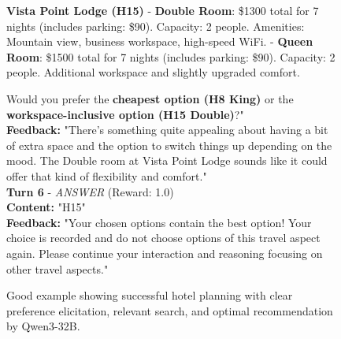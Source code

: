 \begin{figure}[t]
{\begin{tcolorbox}[colback=green!5!white, colframe=green!75!black, 
title=Good Example - Qwen3-32B (Travel-444), boxrule=0.3mm, width=\textwidth, arc=3mm, auto outer arc=true]
\textbf{Vista Point Lodge (H15)}
- \textbf{Double Room}: \$1300 total for 7 nights (includes parking: \$90). Capacity: 2 people. Amenities: Mountain view, business workspace, high-speed WiFi.
- \textbf{Queen Room}: \$1500 total for 7 nights (includes parking: \$90). Capacity: 2 people. Additional workspace and slightly upgraded comfort.

Would you prefer the \textbf{cheapest option (H8 King)} or the \textbf{workspace-inclusive option (H15 Double)}?"\\
\textbf{Feedback:} "There's something quite appealing about having a bit of extra space and the option to switch things up depending on the mood. The Double room at Vista Point Lodge sounds like it could offer that kind of flexibility and comfort."\\

\textbf{Turn 6} - \textit{ANSWER} (Reward: \textcolor{deepgreen}{1.0})\\
\textbf{Content:} "H15"\\
\textbf{Feedback:} "Your chosen options contain the best option! Your choice is recorded and do not choose options of this travel aspect again. Please continue your interaction and reasoning focusing on other travel aspects."
\end{tcolorbox}
}
\caption{Good example showing successful hotel planning with clear preference elicitation, relevant search, and optimal recommendation by Qwen3-32B.}
\label{fig:good_qwen3}
\end{figure}


